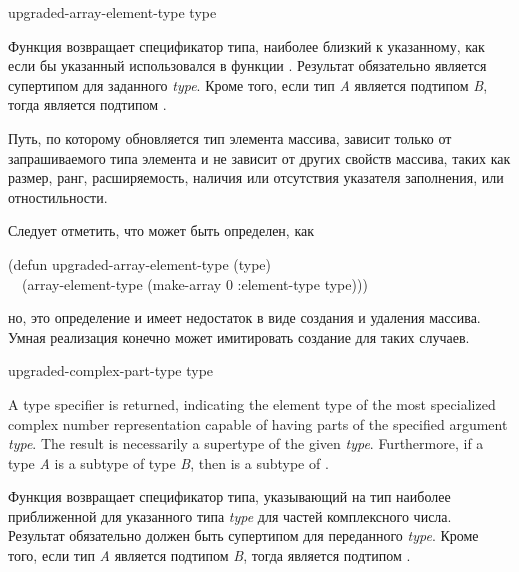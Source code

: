 \begin{defun}[Function]
upgraded-array-element-type type

Функция возвращает спецификатор типа, наиболее близкий к указанному, как если бы
указанный использовался в функции .
Результат обязательно является супертипом для заданного \emph{type}.
Кроме того, если тип \emph{A} является подтипом \emph{B}, тогда 
 является подтипом
.

Путь, по которому обновляется тип элемента массива, зависит только от запрашиваемого
типа элемента и не зависит от других свойств массива, таких как размер, ранг, 
расширяемость, наличия или отсутствия указателя заполнения, или отностильности.

Следует отметить, что  может быть определен,
как
\begin{lisp}
(defun upgraded-array-element-type (type) \\
~~(array-element-type (make-array 0 :element-type type)))
\end{lisp}
но, это определение и имеет недостаток в виде создания и удаления массива. Умная
реализация конечно может имитировать создание для таких случаев.
\end{defun}


\begin{defun}[Function]
upgraded-complex-part-type type

A type specifier is returned, indicating the element type
of the most specialized complex number representation capable of having
parts of the specified argument \emph{type}.
The result is necessarily a supertype of the given \emph{type}.
Furthermore, if a type \emph{A} is a subtype of type \emph{B}, then
 is a subtype of
.

Функция возвращает спецификатор типа, указывающий на тип наиболее
приближенной для указанного типа \emph{type} для частей комплексного числа.
Результат обязательно должен быть супертипом для переданного \emph{type}.
Кроме того, если тип \emph{A} является подтипом \emph{B}, тогда
 является подтипом 
.
\end{defun}

\fi